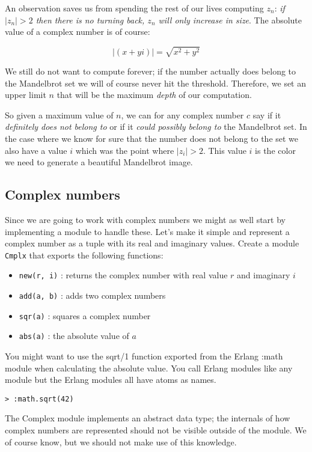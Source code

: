 \documentclass[a4paper,11pt]{article}
\begin{document}
An observation saves us from spending the rest of our lives computing
$z_n$: {\em if $|z_n| > 2$ then there is no turning back, $z_n$ will
  only increase in size}. The absolute value of a complex number is of
course:

$$|(x + yi)| = \sqrt{x^2 + y^2}  $$

We still do not want to compute forever; if the number actually does
belong to the Mandelbrot set we will of course never hit the
threshold. Therefore, we set an upper limit $n$ that will be the
maximum {\em depth} of our computation.

So given a maximum value of $n$, we can for any complex number $c$ say
if it {\em definitely does not belong to} or if it {\em could possibly
  belong to} the Mandelbrot set. In the case where we know for sure
that the number does not belong to the set we also have a value $i$
which was the point where $|z_i| > 2$. This value $i$ is the color we
need to generate a beautiful Mandelbrot image.


\subsection{Complex numbers}
Since we are going to work with complex numbers we might as well start
by implementing a module to handle these. Let's make it simple and
represent a complex number as a tuple with its real and imaginary
values. Create a module {\tt Cmplx} that exports the following
functions:

\begin{itemize}
 \item {\tt new(r, i)} : returns the complex number with real value $r$ and imaginary $i$
 \item {\tt add(a, b)} : adds two complex numbers
 \item {\tt sqr(a)} : squares a complex number
 \item {\tt abs(a)} : the absolute value of $a$
\end{itemize}

You might want to use the sqrt/1 function exported from the Erlang
:math module when calculating the absolute value. You call Erlang modules
like any module but the Erlang modules all have atoms as names.

\begin{verbatim}
> :math.sqrt(42)
\end{verbatim}

The Complex module implements an abstract data type; the internals of
how complex numbers are represented should not be visible outside of the
module. We of course know, but we should not make use of this knowledge.
  
\end{document}
